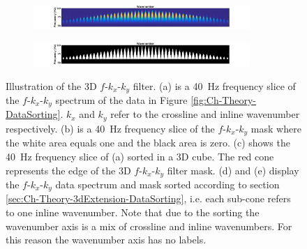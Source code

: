 \begin{figure}
	\begin{subfigure}[t]{\textwidth}
		\centering
		\includegraphics[width=0.9\textwidth]{Plots/IdealData3d/P_fkk_Delphi}
		\caption{}
		\label{fig:Ch-Theory-FK-delphi-data}
	\end{subfigure}
	\par\bigskip
	\begin{subfigure}[t]{\textwidth}
		\centering
		\includegraphics[width=0.9\textwidth]{Plots/IdealData3d/fkk-mask-Delphi}
		\caption{}
		\label{fig:Ch-Theory-FK-delphi-mask}
	\end{subfigure}
	
	\caption{Illustration of the 3D $f$-$k_x$-$k_y$ filter. (a) is a \SI{40}{\hertz} frequency slice of the $f$-$k_x$-$k_y$ spectrum of the data in Figure \ref{fig:Ch-Theory-DataSorting}. $k_x$ and $k_y$ refer to the crossline and inline wavenumber respectively. (b) is a \SI{40}{\hertz} frequency slice of the $f$-$k_x$-$k_y$ mask where the white area equals one and the black area is zero. (c) shows the \SI{40}{\hertz} frequency slice of (a) sorted in a 3D cube. The red cone represents the edge of the 3D $f$-$k_x$-$k_y$ filter mask. (d) and (e) display the $f$-$k_x$-$k_y$ data spectrum and mask sorted according to section \ref{sec:Ch-Theory-3dExtension-DataSorting}, i.e. each sub-cone refers to one inline wavenumber. Note that due to the sorting the wavenumber axis is a mix of crossline and inline wavenumbers. For this reason the wavenumber axis has no labels.}
	\label{fig:Ch-Theory-FKK-Mask}

\end{figure}



